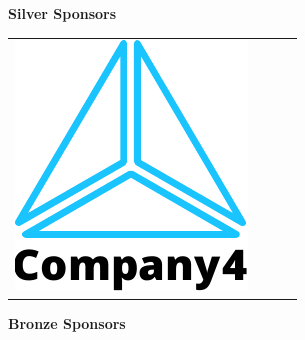 \vspace{.3cm}
\textbf{Silver Sponsors}\\[6pt]
\begin{tabular}[t]{@{}p{} p{}p{} p{}}
\includegraphics[width=.12\textwidth]{figures/Company4_Logo.pdf} &
&
\\
\end{tabular}

\vspace{.3cm}
\textbf{Bronze Sponsors}\\[6pt]

\label{awec:sponsorsend}
\newpage
